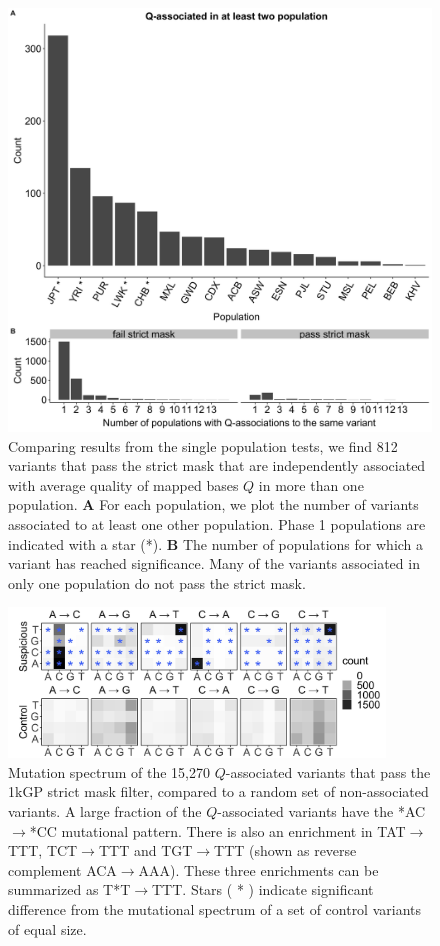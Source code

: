 \documentclass[9pt,article]{template}
\begin{document}
\begin{figure}
\includegraphics[width=\hsize,keepaspectratio]{../Figures/SNPOverlap6.jpg}

\caption{Comparing results from the single population tests, we find 812 variants that pass the strict mask that are independently associated with average quality of mapped bases $Q$ in more than one population.
\textbf{A} For each population, we plot the number of variants associated to at least one other population.
Phase 1 populations are indicated with a star (*).
\textbf{B} The number of populations for which a variant has reached significance. Many of the variants associated in only one population do not pass the strict mask. }
  \label{OverLap}
\end{figure}

\begin{figure}[tbp]
\centering
\includegraphics[width=10cm,keepaspectratio]{../Figures/strict_gcat_mutational_enrichment.jpg}
\caption{Mutation spectrum of the 15,270 $Q$-associated variants that pass the 1kGP strict mask filter, compared to a random set of non-associated variants. A large fraction of the  $Q$-associated variants have the *AC${\rightarrow}$*CC mutational pattern. There is also an enrichment in TAT${\rightarrow}$TTT, TCT${\rightarrow}$TTT and  TGT${\rightarrow}$TTT (shown as reverse complement  ACA${\rightarrow}$AAA). These three enrichments can be summarized as T*T${\rightarrow}$TTT. Stars ( * ) indicate significant difference from the mutational spectrum of a set of control variants of equal size.}  
\label{strict_gcat_mutational_enrichment}
\end{figure}
\end{document}
